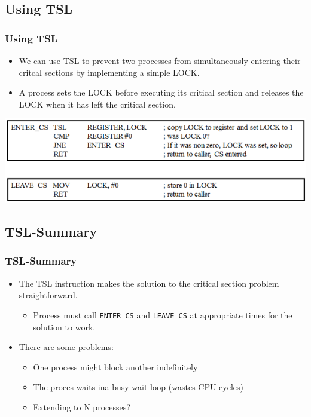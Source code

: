 \documentclass{beamer}
\begin{document}
\subsection{Using TSL}
\begin{frame}
\frametitle{Using TSL}
\begin{itemize}
\item We can use TSL to prevent two processes from simultaneously entering their critcal sections by implementing a simple LOCK.
\item A process sets the LOCK before executing its critical section and releases the LOCK when it has left the critical section.
\end{itemize}
\includegraphics[scale=0.4]{tsl.png}
\end{frame}
\subsection{TSL-Summary}
\begin{frame}
\frametitle{TSL-Summary}
\begin{itemize}
\item The TSL instruction makes the solution to the critical section problem straightforward.
\begin{itemize}
\item Process must call \texttt{ENTER\_CS} and \texttt{LEAVE\_CS} at appropriate times for the solution to work.
\end{itemize}
\item There are some problems:
\begin{itemize}
\item One process might block another indefinitely
\item The proces waits ina busy-wait loop (wastes CPU cycles)
\item Extending to N processes?
\end{itemize}
\end{itemize}
\end{frame}
\end{document}
